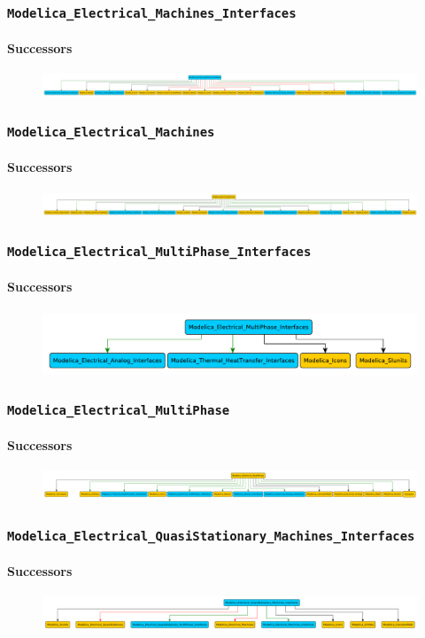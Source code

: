 \documentclass[aspectratio=1610]{beamer}
\begin{document}
\begin{frame}
  \frametitle{\texttt{Modelica\_Electrical\_Machines\_Interfaces}}
  \framesubtitle{Successors}
  \begin{figure}
      \includegraphics[width=\textwidth]{Modelica_Electrical_Machines_Interfaces}
  \end{figure}
\end{frame}

\begin{frame}
  \frametitle{\texttt{Modelica\_Electrical\_Machines}}
  \framesubtitle{Successors}
  \begin{figure}
      \includegraphics[width=\textwidth]{Modelica_Electrical_Machines}
  \end{figure}
\end{frame}

\begin{frame}
  \frametitle{\texttt{Modelica\_Electrical\_MultiPhase\_Interfaces}}
  \framesubtitle{Successors}
  \begin{figure}
      \includegraphics[width=\textwidth]{Modelica_Electrical_MultiPhase_Interfaces}
  \end{figure}
\end{frame}

\begin{frame}
  \frametitle{\texttt{Modelica\_Electrical\_MultiPhase}}
  \framesubtitle{Successors}
  \begin{figure}
      \includegraphics[width=\textwidth]{Modelica_Electrical_MultiPhase}
  \end{figure}
\end{frame}

\begin{frame}
  \frametitle{\texttt{Modelica\_Electrical\_QuasiStationary\_Machines\_Interfaces}}
  \framesubtitle{Successors}
  \begin{figure}
      \includegraphics[width=\textwidth]{Modelica_Electrical_QuasiStationary_Machines_Interfaces}
  \end{figure}
\end{frame}
\end{document}
